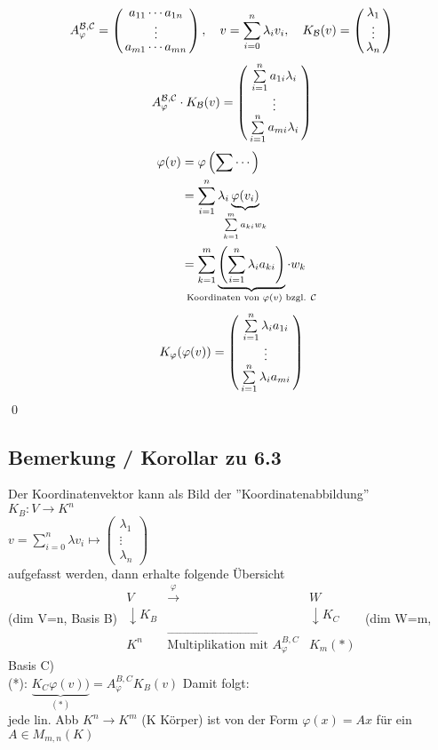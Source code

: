 \begin{align*}
A_\varphi^{\mathcal{B},\mathcal{C}} =
\aMatrix{c}{a_{11}\cdots a_{1n}\\\vdots\\a_{m1}\cdots a_{mn}},
\quad v = \sum\limits_{i=0}^n \lambda_i v_i, \quad K_\mathcal{B}(v) =
\aMatrix{c}{\lambda_1\\\vdots\\\lambda_n}
\end{align*}
\begin{align*}
A_\varphi^{\mathcal{B},\mathcal{C}} \cdot K_\mathcal{B}(v) =
\aMatrix{c}{\sum\limits_{i=1}^n a_{1i}\lambda_i\\\vdots\\\sum\limits_{i=1}^n a_{mi}\lambda_i}
\end{align*}
\begin{align*}
\varphi(v) &= \varphi\left(\sum\cdots\right)\\
&= \sum\limits_{i=1}^n \lambda_i \underbrace{\varphi(v_i)}_{\mathclap{\sum\limits_{k=1}^m a_{ki}w_k}}\\
&= \sum\limits_{k=1}^m \underbrace{\left(\sum\limits_{i=1}^n \lambda_i a_{ki}\right)}_{\mathclap{\text{Koordinaten von }
		\varphi(v) \text{ bzgl. } \mathcal{C}}} \cdot w_k\\
\end{align*}
\begin{align*}
K_\varphi(\varphi(v)) =
\aMatrix{c}{\sum\limits_{i=1}^n \lambda_i a_{1i}\\\vdots\\\sum\limits_{i=1}^n \lambda_i a_{mi}}
\end{align*}
\qed

\subsection{Bemerkung / Korollar zu 6.3}
Der Koordinatenvektor kann als Bild der ''Koordinatenabbildung''\\
$K_B: V\rightarrow K^n$\\
$v=\sum_{i=0}^n \lambda v_i \mapsto \begin{pmatrix}\lambda_1 \\ \vdots \\ \lambda_n\end{pmatrix}$\\
aufgefasst werden, dann erhalte folgende Übersicht\\
(dim V=n, Basis B) $\begin{array}{lcr}
V& \stackrel{\varphi}{\rightarrow} & W\\
\downarrow K_B & & \downarrow K_C\\
K^n & \stackrel{\rightarrow}{\text{Multiplikation mit } A_{\varphi}^{B,C}} & K_m (*)
\end{array}$ (dim W=m, Basis C)\\
(*): $\underbrace{K_{C}\varphi(v))}_{(*)}=A_{\varphi}^{B,C} K_B(v)$
Damit folgt:\\
jede lin. Abb $K^n\rightarrow K^m$ (K Körper) ist von der Form $\varphi(x)=Ax$ für ein $A \in M_{m,n}(K)$


